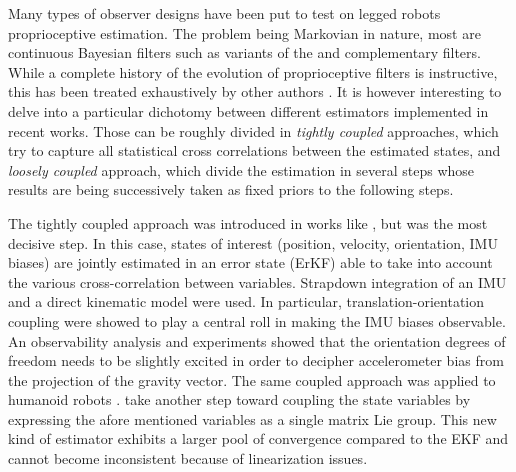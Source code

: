 Many types of observer designs have been put to test on legged robots proprioceptive estimation. The problem being Markovian in nature,
most are continuous Bayesian filters such as variants of the \KalmanF \cite{kalman1960new} and complementary filters. While a complete history of 
the evolution of proprioceptive filters is instructive, this has been treated exhaustively by other authors \cite{bloesch2017state, camurri2017multisensory}. 
It is however interesting to delve into a particular dichotomy between different estimators implemented in recent works. Those can be 
roughly divided in \textit{tightly coupled} approaches, which try to capture all statistical cross correlations between the estimated states,
and \textit{loosely coupled} approach, which divide the estimation in several steps whose results are being successively taken as fixed priors to the 
following steps.

The tightly coupled approach was introduced in works like \cite{chilian2011multisensor}, but \cite{bloesch2013state} was the most decisive step.
In this case, states of interest (position, velocity, orientation, IMU biases) are jointly estimated in an error state \KalmanF (ErKF) able to take into account
the various cross-correlation between variables. Strapdown integration of an IMU and a direct kinematic model were used. In particular, 
translation-orientation coupling were showed to play a central roll in making the IMU biases observable. An observability analysis and experiments 
showed that the orientation degrees of freedom needs to be slightly excited in order to decipher accelerometer bias from the projection of the 
gravity vector. The same coupled approach was applied to humanoid robots \cite{rotella2014state, fallon2014drift}.
\cite{bledt2018cheetah} take another step toward coupling the state variables by expressing the afore mentioned variables as a single matrix Lie group.
This new kind of estimator exhibits a larger pool of convergence compared to the EKF and cannot become inconsistent because of linearization issues. 

